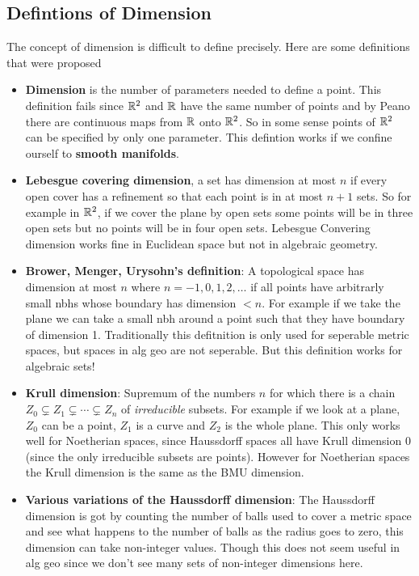 \subsection{Defintions of Dimension}
The concept of dimension is difficult to define precisely. Here are some definitions that were proposed
\begin{definition}
    \begin{itemize}
        \item \textbf{Dimension} is the number of parameters needed to define a point. This definition fails since $\mathbb{R}^2$ and $\mathbb{R}$ have the same number of points and by Peano there are continuous maps from $\mathbb{R}$ onto $\mathbb{R}^2$. So in some sense points of $\mathbb{R}^2$ can be specified by only one parameter. This defintion works if we confine ourself to \textbf{smooth manifolds}.
        \item \textbf{Lebesgue covering dimension}, a set has dimension at most $n$ if every open cover has a refinement so that each point is in at most $n+1$ sets. So for example in $\mathbb{R}^2$, if we cover the plane by open sets some points will be in three open sets but no points will be in four open sets. Lebesgue Convering dimension works fine in Euclidean space but not in algebraic geometry.
        \item \textbf{Brower, Menger, Urysohn's definition}: A topological space has dimension at most $n$ where $n=-1,0,1,2,\ldots$  if all points have arbitrarly small nbhs whose boundary has dimension $<n$. For example if we take the plane we can take a small nbh around a point such that they have boundary of dimension 1. Traditionally this defitnition is only used for seperable metric spaces, but spaces in alg geo are not seperable. But this definition works for algebraic sets!
        \item \textbf{Krull dimension}: Supremum of the numbers $n$ for which there is a chain $Z_0\subsetneq Z_1\subsetneq \cdots\subsetneq Z_n$ of \textit{irreducible} subsets. For example if we look at a plane, $Z_0$ can be a point, $Z_1$ is a curve and $Z_2$ is the whole plane. This only works well for Noetherian spaces, since Haussdorff spaces all have Krull dimension $0$ (since the only irreducible subsets are points). However for Noetherian spaces the Krull dimension is the same as the BMU dimension.
        \item \textbf{Various variations of the Haussdorff dimension}: The Haussdorff dimension is got by counting the number of balls used to cover a metric space and see what happens to the number of balls as the radius goes to zero, this dimension can take non-integer values. Though this does not seem useful in alg geo since we don't see many sets of non-integer dimensions here.

\end{itemize}
\end{definition}
